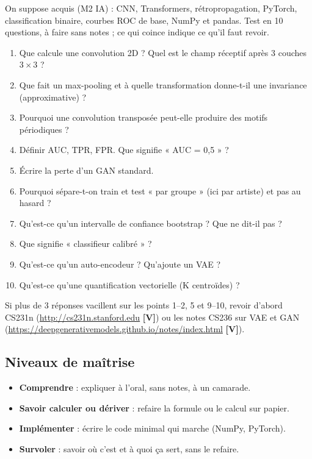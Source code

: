 \documentclass[11pt,a4paper]{article}
\newcommand{\sV}{\textbf{[V]}}
\begin{document}
On suppose acquis (M2 IA) : CNN, Transformers, rétropropagation, PyTorch, classification binaire, courbes ROC de base, NumPy et pandas. Test en 10 questions, à faire sans notes ; ce qui coince indique ce qu'il faut revoir.
\begin{enumerate}
  \item Que calcule une convolution 2D ? Quel est le champ réceptif après 3 couches $3\times 3$ ?
  \item Que fait un max-pooling et à quelle transformation donne-t-il une invariance (approximative) ?
  \item Pourquoi une convolution transposée peut-elle produire des motifs périodiques ?
  \item Définir AUC, TPR, FPR. Que signifie « AUC = 0,5 » ?
  \item Écrire la perte d'un GAN standard.
  \item Pourquoi sépare-t-on train et test « par groupe » (ici par artiste) et pas au hasard ?
  \item Qu'est-ce qu'un intervalle de confiance bootstrap ? Que ne dit-il pas ?
  \item Que signifie « classifieur calibré » ?
  \item Qu'est-ce qu'un auto-encodeur ? Qu'ajoute un VAE ?
  \item Qu'est-ce qu'une quantification vectorielle (K centroïdes) ?
\end{enumerate}
Si plus de 3 réponses vacillent sur les points 1--2, 5 et 9--10, revoir d'abord CS231n (\url{http://cs231n.stanford.edu} \sV) ou les notes CS236 sur VAE et GAN (\url{https://deepgenerativemodels.github.io/notes/index.html} \sV).

\subsection{Niveaux de maîtrise}

\begin{itemize}
  \item \textbf{Comprendre} : expliquer à l'oral, sans notes, à un camarade.
  \item \textbf{Savoir calculer ou dériver} : refaire la formule ou le calcul sur papier.
  \item \textbf{Implémenter} : écrire le code minimal qui marche (NumPy, PyTorch).
  \item \textbf{Survoler} : savoir où c'est et à quoi ça sert, sans le refaire.
\end{itemize}
\end{document}
